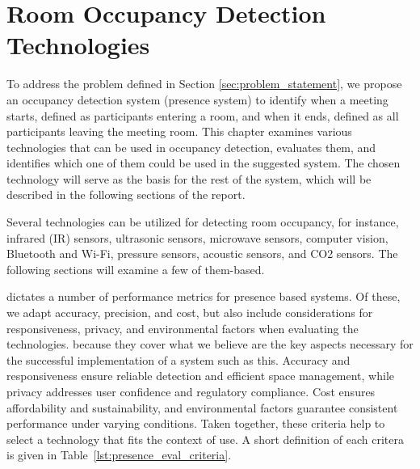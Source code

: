 \chapter{Room Occupancy Detection Technologies}\label{chap:presence_intro}
To address the problem defined in Section \ref{sec:problem_statement}, we propose an occupancy detection system (presence system) to identify when a meeting starts, defined as participants entering a room, and when it ends, defined as all participants leaving the meeting room.
This chapter examines various technologies that can be used in occupancy detection, evaluates them, and identifies which one of them could be used in the suggested system.
The chosen technology will serve as the basis for the rest of the system, which will be described in the following sections of the report.

Several technologies can be utilized for detecting room occupancy, for instance, infrared (IR) sensors\cite{woodward-2021, dodierBuildingOccupancyDetection2006, OccupancySensorMotion}, ultrasonic sensors\cite{woodward-2021, dodierBuildingOccupancyDetection2006, OccupancySensorMotion}, microwave sensors\cite{woodward-2021}, computer vision\cite{co2sensor, longoAccurateOccupancyEstimation2019, OccupancySensorMotion}, Bluetooth and Wi-Fi\cite{teissedre-2019}, pressure sensors\cite{OccupancySensorMotion}, acoustic sensors\cite{OccupancySensorMotion}, and CO2 sensors\cite{co2sensor, longoAccurateOccupancyEstimation2019, jinSensingProxyOccupancy2015}.\cite{faragherLocationFingerprintingBluetooth2015}
The following sections will examine a few of them-based.

\citeauthor{presence_ble_review} \cite{presence_ble_review} dictates a number of performance metrics for presence based systems. Of these, we adapt accuracy, precision, and cost, but also include considerations for responsiveness, privacy, and environmental factors when evaluating the technologies.
because they cover what we believe are the key aspects necessary for the successful implementation of a system such as this.
Accuracy and responsiveness ensure reliable detection and efficient space management, while privacy addresses user confidence and regulatory compliance.
Cost ensures affordability and sustainability, and environmental factors guarantee consistent performance under varying conditions.
Taken together, these criteria help to select a technology that fits the context of use.
A short definition of each critera is given in Table~\ref{lst:presence_eval_criteria}.



